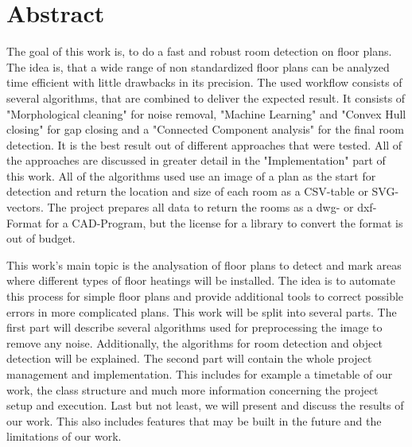 \section{Abstract}
The goal of this work is, to do a fast and robust room detection on floor plans. The idea is, that a wide range of non standardized floor plans can be analyzed time efficient with little drawbacks in its precision.
The used workflow consists of several algorithms, that are combined to deliver the expected result. It consists of "Morphological cleaning" for noise removal, "Machine Learning" and "Convex Hull closing" for gap closing and a "Connected Component analysis" for the final room detection. It is the best result out of different approaches that were tested. All of the approaches are discussed in greater detail in the "Implementation" part of this work. All of the algorithms used use an image of a plan  as the start for detection and return the location and size of each room as a CSV-table or SVG-vectors. The project prepares all data to return the rooms as a dwg- or dxf-Format for a CAD-Program, but the license for a library to convert the format is out of budget.

This work's main topic is the analysation of floor plans to detect and mark areas where different types of floor heatings will be installed. The idea is to automate this process for simple floor plans and provide additional tools to correct possible errors in more complicated plans.
This work will be split into several parts. The first part will describe several algorithms used for preprocessing the image to remove any noise. Additionally, the algorithms for room detection and object detection will be explained.
The second part will contain the whole project management and implementation. This includes for example a timetable of our work, the class structure and much more information concerning the project setup and execution.
Last but not least, we will present and discuss the results of our work. This also includes features that may be built in the future and the limitations of our work.